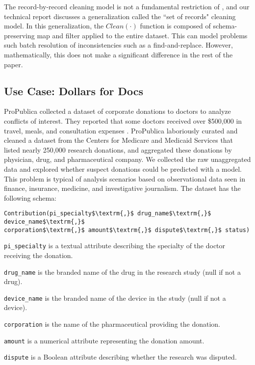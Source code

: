 The record-by-record cleaning model is not a fundamental restriction of \sys, and our technical report discusses a generalization called the ``set of records" cleaning model.
In this generalization, the $Clean(\cdot)$ function is composed of schema-preserving \textsf{map} and \textsf{filter} applied to the entire dataset.
This can model problems such batch resolution of inconsistencies such as a find-and-replace.
However, mathematically, this does not make a significant difference in the rest of the paper.

\subsection{Use Case: Dollars for Docs \cite{dollarsfordocs}}\label{s:usecase}
ProPublica collected a dataset of corporate donations to doctors to analyze conflicts of interest. 
They reported that some doctors received over \$500,000 in travel, meals, and consultation expenses \cite{dollarsfordocsa}.
ProPublica laboriously curated and cleaned a dataset from the Centers for Medicare and Medicaid Services that listed nearly 250,000 research donations, and aggregated these donations by physician, drug, and pharmaceutical company.
We collected the raw unaggregated data and explored whether suspect donations could be predicted with a model.
This problem is typical of analysis scenarios based on observational data seen in finance, insurance, medicine, and investigative journalism.
The dataset has the following schema:
\begin{lstlisting}[mathescape,basicstyle={\scriptsize}]
Contribution(pi_specialty$\textrm{,}$ drug_name$\textrm{,}$ device_name$\textrm{,}$
corporation$\textrm{,}$ amount$\textrm{,}$ dispute$\textrm{,}$ status)
\end{lstlisting}

\noindent\texttt{pi\_specialty} is a textual attribute describing the specialty of the doctor receiving the donation.

\noindent\texttt{drug\_name} is the branded name of the drug in the research study (null if not a drug).

\noindent\texttt{device\_name} is the branded name of the device in the study (null if not a device).

\noindent\texttt{corporation} is the name of the pharmaceutical providing the donation.

\noindent\texttt{amount} is a numerical attribute representing the donation amount.

\noindent\texttt{dispute} is a Boolean attribute describing whether the research was disputed.

